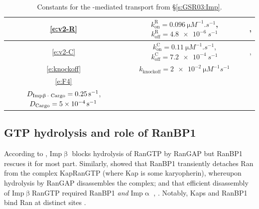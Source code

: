 \documentclass[12pt,notitlepage]{article}
\begin{document}
\begin{table}
\centering
\small
\begin{tabular}{c|c|c}
	\hline
	\eqref{e:v2-R}
	&
	$k_\text{on}^\text{R} = \SI{0.096}{\micro M^{-1} . s^{-1}}$,
	\;
	$k_\text{off}^\text{R} = \SI{4.8e-6}{s^{-1}}$
	&
	\footnotesize
	\cite[Supp.~Table~A]{GoerlichSeewaldRibbeck2003},
	\cite[Table II]{RiddickMacara2005}
	\\
	\hline
	\eqref{e:v2-C}
	&
	$k_\text{on}^\text{C} = \SI{0.11}{\micro M^{-1} . s^{-1}}$,
	\quad
	$k_\text{off}^\text{C} = \SI{7.2e-4}{s^{-1}}$
	&
	\cite[Table~I]{Catimel2001},
	\cite[Table~II]{RiddickMacara2005}
	\\
	\hline
	\eqref{e:knockoff}
	&
	$k_\text{knockoff} = \SI{2e-2}{\micro M^{-1} s^{-1}}$
	&
	\cite[Table II]{RiddickMacara2005}
	\\
	\hline
	\eqref{e:F4}
	&
	\makecell{
		$D_{\ce{Imp\beta . Ran . GTP}} = \SI{0.07}{s^{-1}}$, \quad
		$D_{\ce{Imp\beta}} = \SI{0.4}{s^{-1}}$
		\\
		$D_{\ce{Imp\beta . Cargo}} = \SI{0.25}{s^{-1}}$, \;	
		$D_{\ce{Cargo}} = \SI{5e-4}{s^{-1}}$
	}
	&
	\cite[Table III]{RiddickMacara2005}
	\\
	\hline
\end{tabular}
%
\caption{%
	Constants for the -mediated
	transport from \S\ref{s:GSR03:Imp}.
}
%
\label{t:GSR-ImpB-const}
\end{table}







\subsection{GTP hydrolysis and role of RanBP1} \label{ss:ranbp1}

According to 
\cite[\href{https://i.ibb.co/6ghqPB7/image.jpg}{Fig.~4A}]{LounsburyMacara1997},
{Imp$\upbeta$} blocks hydrolysis of {RanGTP} by {RanGAP}
but 
{RanBP1} rescues it for most part.
%
%
Similarly,
\cite{BischoffGoerlich1997}
showed that
{RanBP1} transiently detaches {Ran} 
from the complex 
KapRanGTP
(where {Kap} is some karyopherin),
whereupon hydrolysis by {RanGAP} 
disassembles the complex;
and
that efficient disassembly 
of {Imp$\upbeta$}RanGTP required {{RanBP1}} \emph{and} {{Imp$\upalpha$}}
\cite[\S3.2, cf.~\href{https://i.ibb.co/PZKRSJ0/image.jpg}{Fig.~4}]{BischoffGoerlich1997},
\cite{FloerBlobelRexach1997}.
%
%
Notably,
Kaps and RanBP1
bind {Ran}
at distinct sites
\cite[p.253]{BischoffGoerlich1997}.
\end{document}
